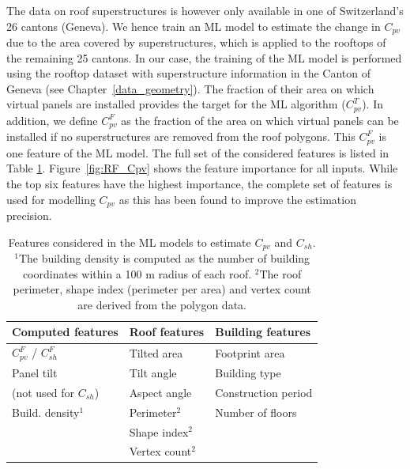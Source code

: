 The data on roof superstructures is however only available in one of Switzerland's 26 cantons (Geneva). We hence train an ML model to estimate the change in $C_{\mathit{pv}}$ due to the area covered by superstructures, which is applied to the rooftops of the remaining 25 cantons.
%
In our case, the training of the ML model is performed using the rooftop dataset with superstructure information in the Canton of Geneva (see Chapter~\ref{data_geometry}).
The fraction of their area on which virtual panels are installed provides the target for the ML algorithm ($C_{\mathit{pv}}^T$).
In addition, we define $C_{\mathit{pv}}^F$ as the fraction of the area on which virtual panels can be installed if no superstructures are removed from the roof polygons. This $C_{\mathit{pv}}^F$ is one feature of the ML model. %
The full set of the considered features is listed in Table \ref{tab:features}. 
Figure~\ref{fig:RF_Cpv} shows the feature importance for all inputs. 
While the top six features have the highest importance, 
the complete set of features is used for modelling $C_{\mathit{pv}}$ as this has been found to improve the estimation precision.

\begin{table}[b]
\centering
\footnotesize
\caption{Features considered in the ML models to estimate $C_{\mathit{pv}}$ and $C_{sh}$. $^1$The building density is computed as the number of building coordinates within a 100 m radius of each roof. $^2$The roof perimeter, shape index (perimeter per area) and vertex count are derived from the polygon data.}
\label{tab:features}
\begin{tabular}{lll}
\hline
\textbf{Computed features}               & \textbf{Roof features} & \textbf{Building features} \\
\hline
$C_{\mathit{pv}}^F$ / $C_{sh}^F$ & Tilted area                          & Footprint area                              \\
Panel tilt   & Tilt angle                          & Building type                              \\
(not used for $C_{sh}$)      & Aspect angle                        & Construction period          \\
Build. density$^1$                    & Perimeter$^2$                       & Number of floors                             \\
                                 & Shape index$^2$                       &   \\
 & Vertex count$^2$ & \\ 
\hline                                
\end{tabular}
\end{table}

